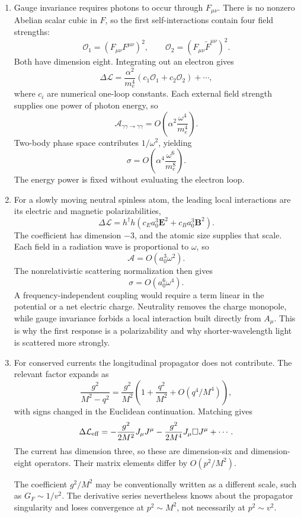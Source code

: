 \begin{enumerate}
\begin{enumerate}
\item
Gauge invariance requires photons to occur through \(F_{\mu\nu}\).
There is no nonzero Abelian scalar cubic in \(F\), so the first
self-interactions contain four field strengths:
\[
 \mathcal O_1=(F_{\mu\nu}F^{\mu\nu})^2,\qquad
 \mathcal O_2=(F_{\mu\nu}\widetilde F^{\mu\nu})^2.
\]
Both have dimension eight.  Integrating out an electron gives
\[
 \Delta\mathcal L
 =\frac{\alpha^2}{m_e^4}(c_1\mathcal O_1+c_2\mathcal O_2)+\cdots,
\]
where \(c_i\) are numerical one-loop constants.  Each external field
strength supplies one power of photon energy, so
\[
 \mathcal A_{\gamma\gamma\to\gamma\gamma}
 =O\left(\alpha^2\frac{\omega^4}{m_e^4}\right).
\]
Two-body phase space contributes \(1/\omega^2\), yielding
\[
 \boxed{\sigma=O\left(\alpha^4\frac{\omega^6}{m_e^8}\right).}
\]
The energy power is fixed without evaluating the electron loop.
\item
For a slowly moving neutral spinless atom, the leading local interactions
are its electric and magnetic polarizabilities,
\[
 \Delta\mathcal L=h^\dagger h
 \left(c_Ea_0^3\mathbf E^2+c_Ba_0^3\mathbf B^2\right).
\]
The coefficient has dimension \(-3\), and the atomic size supplies that
scale.  Each field in a radiation wave is proportional to \(\omega\), so
\[
 \mathcal A=O(a_0^3\omega^2).
\]
The nonrelativistic scattering normalization then gives
\[
 \boxed{\sigma=O(a_0^6\omega^4).}
\]
A frequency-independent coupling would require a term linear in the
potential or a net electric charge.  Neutrality removes the charge
monopole, while gauge invariance forbids a local interaction built directly
from \(A_\mu\).  This is why the first response is a polarizability and why
shorter-wavelength light is scattered more strongly.
\item
For conserved currents the longitudinal propagator does not contribute.
The relevant factor expands as
\[
 \frac{g^2}{M^2-q^2}
 =\frac{g^2}{M^2}
 \left(1+\frac{q^2}{M^2}+O(q^4/M^4)\right),
\]
with signs changed in the Euclidean continuation.  Matching gives
\[
 \Delta\mathcal L_{\rm eff}
 =-\frac{g^2}{2M^2}J_\mu J^\mu
 -\frac{g^2}{2M^4}J_\mu\Box J^\mu+\cdots.
\]
The current has dimension three, so these are dimension-six and
dimension-eight operators.  Their matrix elements differ by
\(O(p^2/M^2)\).

The coefficient \(g^2/M^2\) may be conventionally written as a different
scale, such as \(G_F\sim1/v^2\).  The derivative series nevertheless knows
about the propagator singularity and loses convergence at \(p^2\sim M^2\),
not necessarily at \(p^2\sim v^2\).
\end{enumerate}


\end{enumerate}
